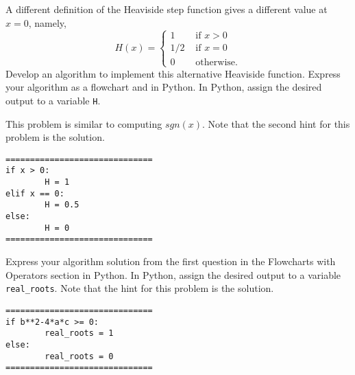 \documentclass{ximera}
\begin{document}
\begin{question}
A different definition of the Heaviside step function gives a different value at $x=0$, namely,
	$$H(x)=\begin{cases} 1 &\text{ if $x>0$}\\
		1/2 &\text{ if $x=0$}\\
		0 &\text{ otherwise.}
	\end{cases}$$
Develop an algorithm to implement this alternative Heaviside function. Express your algorithm as a flowchart and in Python. In Python, assign the desired output to a variable \verb|H|.
	\begin{hint}
		This problem is similar to computing $sgn(x)$. Note that the second hint for this problem is the solution.
	\end{hint}
	\begin{hint}
	\begin{center}
	\end{center}
\begin{verbatim}
==============================
if x > 0:
        H = 1
elif x == 0:
        H = 0.5
else:
        H = 0
==============================
\end{verbatim}
	\end{hint}
\end{question}

\begin{question}
	Express your algorithm solution from the first question in the Flowcharts with Operators section in Python. In Python, assign the desired output to a variable \verb|real_roots|.  Note that the hint for this problem is the solution.
	\begin{hint}
\begin{verbatim}
==============================
if b**2-4*a*c >= 0:
        real_roots = 1
else:
        real_roots = 0
==============================
\end{verbatim}
	\end{hint}
\end{question}
\end{document}
